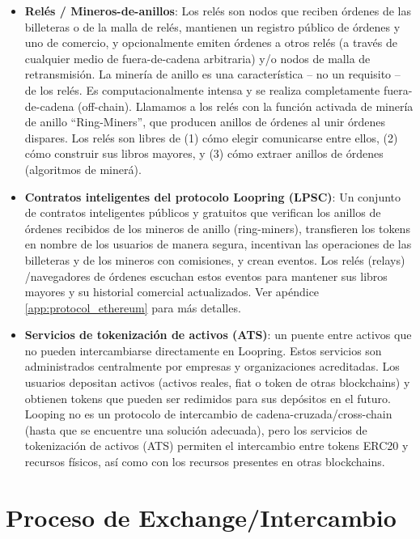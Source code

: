 \documentclass[UTF8,nofonts]{article}
\begin{document}
\begin{multicols}{2}
\begin{itemize}
\item \textbf{Rel\'es / Mineros-de-anillos}: Los rel\'es son nodos que reciben \'ordenes de las billeteras o de la malla de rel\'es, mantienen un registro p\'ublico de \'ordenes y uno de comercio, y opcionalmente emiten \'ordenes a otros rel\'es (a trav\'es de cualquier medio de fuera-de-cadena arbitraria) y/o nodos de malla de retransmisi\'on. La miner\'ia de anillo es una caracter\'istica -- no un requisito -- de los rel\'es. Es computacionalmente intensa y se realiza completamente fuera-de-cadena (off-chain). Llamamos a los rel\'es con la funci\'on activada de miner\'ia de anillo \enquote{Ring-Miners}, que producen anillos de \'ordenes al unir \'ordenes dispares. Los rel\'es son libres de (1) c\'omo elegir comunicarse entre ellos, (2) c\'omo construir sus libros mayores, y (3) c\'omo extraer anillos de \'ordenes (algoritmos de miner\'a).

\item \textbf{Contratos inteligentes del protocolo Loopring (LPSC)}: Un conjunto de contratos inteligentes p\'ublicos y gratuitos que verifican los anillos de \'ordenes recibidos de los mineros de anillo (ring-miners), transfieren los tokens en nombre de los usuarios de manera segura, incentivan las operaciones de las billeteras y de los mineros con comisiones, y crean eventos. Los rel\'es (relays) /navegadores de \'ordenes escuchan estos eventos para mantener sus libros mayores y su historial comercial actualizados. Ver ap\'endice \ref{app:protocol_ethereum} para m\'as detalles.

\item \textbf{Servicios de tokenizaci\'on de activos (ATS)}: un puente entre activos que no pueden intercambiarse directamente en Loopring. Estos servicios son administrados centralmente por empresas y organizaciones acreditadas. Los usuarios depositan activos (activos reales, fiat o token de otras blockchains) y obtienen tokens que pueden ser redimidos para sus dep\'ositos en el futuro. Looping no es un protocolo de intercambio de cadena-cruzada/cross-chain (hasta que se encuentre una soluci\'on adecuada), pero los servicios de tokenizaci\'on de activos (ATS) permiten el intercambio entre tokens ERC20 \cite{ERC20} y recursos f\'isicos, as\'i como con los recursos presentes en otras blockchains.

\end{itemize}



\section{Proceso de Exchange/Intercambio\label{sec:process}}
\begin{enumerate} 


\end{enumerate}
\end{multicols}
\end{document}

